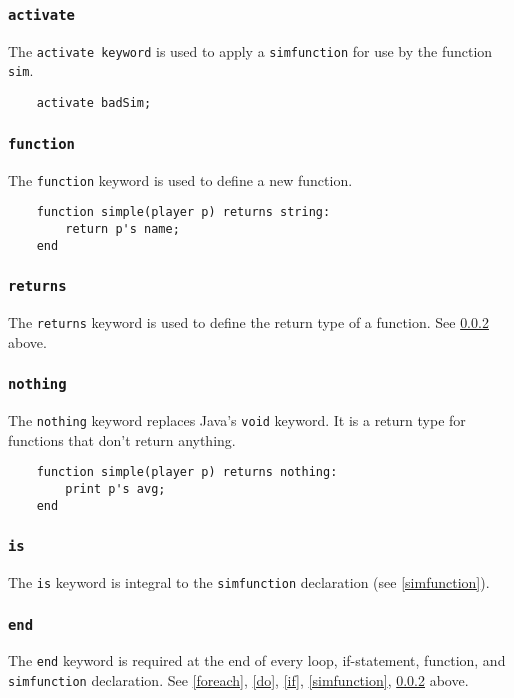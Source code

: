 \subsubsection{\texttt{activate}}\label{activate}
The \texttt{activate keyword} is used to apply a \texttt{simfunction} for use by the function \texttt{sim}.
\begin{verbatim}
    activate badSim;
\end{verbatim} 

\subsubsection{\texttt{function}} \label{function}
The \texttt{function} keyword is used to define a new function.
\begin{verbatim}
    function simple(player p) returns string:
        return p's name;
    end
\end{verbatim}

\subsubsection{\texttt{returns}}\label{returns}
The \texttt{returns} keyword is used to define the return type of a function. See \ref{function} above.

\subsubsection{\texttt{nothing}}\label{nothing}
The \texttt{nothing} keyword replaces Java's \texttt{void} keyword. It is a return type for functions that don't return anything.
\begin{verbatim}
    function simple(player p) returns nothing:
        print p's avg;
    end
\end{verbatim}

\subsubsection{\texttt{is}}\label{is}
The \texttt{is} keyword is integral to the \texttt{simfunction} declaration (see \ref{simfunction}). 

\subsubsection{\texttt{end}}\label{end}
The \texttt{end} keyword is required at the end of every loop, if-statement, function, and \texttt{simfunction} declaration. See \ref{foreach}, \ref{do}, \ref{if}, \ref{simfunction}, \ref{function} above.

